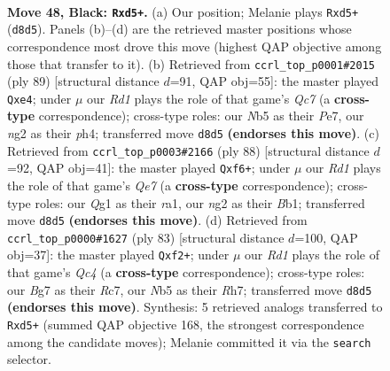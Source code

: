 \documentclass[11pt]{article}
\begin{document}
\clearpage

\begin{figure}[p]\centering
\begin{subfigure}{0.46\textwidth}\centering
\resizebox{\linewidth}{!}{%
\newchessgame
\chessboard[
  setfen={3r2k1/1r3pb1/R7/1n1Qp1R1/4P3/3K4/3N2N1/6q1 b - - 7 48},
  showmover=false,
  pgfstyle=straightmove, color=movearrow, markmove={d8-d5}
]}
\caption{}
\end{subfigure}\hfill
\begin{subfigure}{0.46\textwidth}\centering
\resizebox{\linewidth}{!}{%
\newchessgame
\chessboard[
  setfen={8/4prbk/6pp/3R4/4QP1P/6P1/2qN3K/8 b - - 15 45},
  showmover=false,
  pgfstyle=straightmove, color=movearrow, markmove={c2-e4}
]}
\caption{}
\end{subfigure}
\\[4pt]
\begin{subfigure}{0.46\textwidth}\centering
\resizebox{\linewidth}{!}{%
\newchessgame
\chessboard[
  setfen={8/4Qpk1/5qPp/8/8/1b4P1/5P2/rB1R2K1 w - - 4 45},
  showmover=false,
  pgfstyle=straightmove, color=movearrow, markmove={e7-f6}
]}
\caption{}
\end{subfigure}\hfill
\begin{subfigure}{0.46\textwidth}\centering
\resizebox{\linewidth}{!}{%
\newchessgame
\chessboard[
  setfen={8/2r2k1r/pR3p2/2q1p2p/P6N/6P1/5QKp/3R4 b - - 1 42},
  showmover=false,
  pgfstyle=straightmove, color=movearrow, markmove={c5-f2}
]}
\caption{}
\end{subfigure}
\caption{\textbf{Move 48, Black: \texttt{Rxd5+}.} (a) Our position; Melanie plays \texttt{Rxd5+} (\texttt{d8d5}). Panels (b)--(d) are the retrieved master positions whose correspondence most drove this move (highest QAP objective among those that transfer to it). (b) Retrieved from \texttt{ccrl\_top\_p0001\#2015} (ply 89) [structural distance $d$=91, QAP obj=55]: the master played \texttt{Qxe4}; under $\mu$ our \emph{Rd1} plays the role of that game's \emph{Qc7} (a \textbf{cross-type} correspondence); cross-type roles: our \emph{N}b5 as their \emph{P}e7, our \emph{n}g2 as their \emph{p}h4; transferred move \texttt{d8d5} \textbf{(endorses this move)}. (c) Retrieved from \texttt{ccrl\_top\_p0003\#2166} (ply 88) [structural distance $d$=92, QAP obj=41]: the master played \texttt{Qxf6+}; under $\mu$ our \emph{Rd1} plays the role of that game's \emph{Qe7} (a \textbf{cross-type} correspondence); cross-type roles: our \emph{Q}g1 as their \emph{r}a1, our \emph{n}g2 as their \emph{B}b1; transferred move \texttt{d8d5} \textbf{(endorses this move)}. (d) Retrieved from \texttt{ccrl\_top\_p0000\#1627} (ply 83) [structural distance $d$=100, QAP obj=37]: the master played \texttt{Qxf2+}; under $\mu$ our \emph{Rd1} plays the role of that game's \emph{Qc4} (a \textbf{cross-type} correspondence); cross-type roles: our \emph{B}g7 as their \emph{R}c7, our \emph{N}b5 as their \emph{R}h7; transferred move \texttt{d8d5} \textbf{(endorses this move)}. Synthesis: 5 retrieved analogs transferred to \texttt{Rxd5+} (summed QAP objective 168, the strongest correspondence among the candidate moves); Melanie committed it via the \texttt{search} selector.}
\label{fig:thought-m95}
\end{figure}
\end{document}
